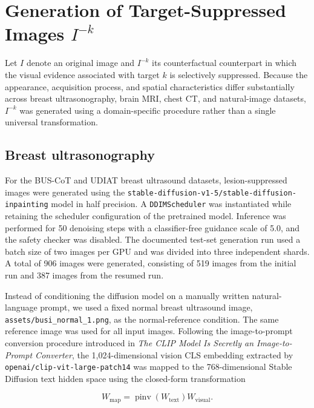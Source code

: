 
\section{Generation of Target-Suppressed Images $I^{-k}$}

Let $I$ denote an original image and $I^{-k}$ its counterfactual counterpart in which the visual evidence associated with target $k$ is selectively suppressed. Because the appearance, acquisition process, and spatial characteristics differ substantially across breast ultrasonography, brain MRI, chest CT, and natural-image datasets, $I^{-k}$ was generated using a domain-specific procedure rather than a single universal transformation.

\subsection{Breast ultrasonography}

For the BUS-CoT and UDIAT breast ultrasound datasets, lesion-suppressed images were generated using the \texttt{stable-diffusion-v1-5/stable-diffusion-inpainting} model in half precision. A \texttt{DDIMScheduler} was instantiated while retaining the scheduler configuration of the pretrained model. Inference was performed for 50 denoising steps with a classifier-free guidance scale of 5.0, and the safety checker was disabled. The documented test-set generation run used a batch size of two images per GPU and was divided into three independent shards. A total of 906 images were generated, consisting of 519 images from the initial run and 387 images from the resumed run.

Instead of conditioning the diffusion model on a manually written natural-language prompt, we used a fixed normal breast ultrasound image, \texttt{assets/busi\_normal\_1.png}, as the normal-reference condition. The same reference image was used for all input images. Following the image-to-prompt conversion procedure introduced in \emph{The CLIP Model Is Secretly an Image-to-Prompt Converter}, the 1,024-dimensional vision CLS embedding extracted by \texttt{openai/clip-vit-large-patch14} was mapped to the 768-dimensional Stable Diffusion text hidden space using the closed-form transformation

\[
W_{\mathrm{map}}
=
\operatorname{pinv}\!\left(W_{\mathrm{text}}\right)
W_{\mathrm{visual}}.
\]

